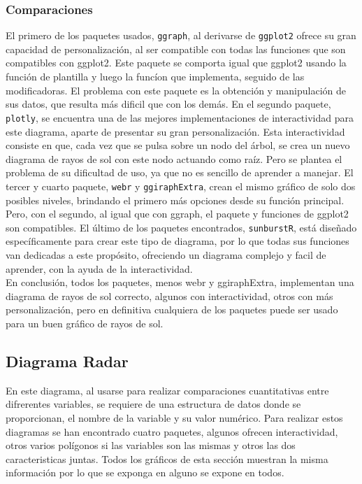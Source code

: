 \documentclass{article}\usepackage[]{graphicx}\usepackage[]{color}
\begin{document}
\subsubsection{Comparaciones}
El primero de los paquetes usados, \texttt{ggraph}, al derivarse de \texttt{ggplot2} ofrece su gran capacidad de personalizaci\'on, al ser compatible con todas las funciones que son compatibles con ggplot2. Este paquete se comporta igual que ggplot2 usando la funci\'on de plantilla y luego la func\'ion que implementa, seguido de las modificadoras. El problema con este paquete es la obtenci\'on y manipulaci\'on de sus datos, que resulta m\'as dificil que con los dem\'as.
En el segundo paquete, \texttt{plotly}, se encuentra una de las mejores implementaciones de interactividad para este diagrama, aparte de presentar su gran personalizaci\'on. Esta interactividad consiste en que, cada vez que se pulsa sobre un nodo del \'arbol, se crea un nuevo diagrama de rayos de sol con este nodo actuando como ra\'iz. Pero se plantea el problema de su dificultad de uso, ya que no es sencillo de aprender a manejar.
El tercer y cuarto paquete, \texttt{webr} y \texttt{ggiraphExtra}, crean el mismo gr\'afico de solo dos posibles niveles, brindando el primero m\'as opciones desde su funci\'on principal. Pero, con el segundo, al igual que con ggraph, el paquete y funciones de ggplot2 son compatibles.
El \'ultimo de los paquetes encontrados, \texttt{sunburstR}, est\'a dise\~nado espec\'ificamente para crear este tipo de diagrama, por lo que todas sus funciones van dedicadas a este prop\'osito, ofreciendo un diagrama complejo y facil de aprender, con la ayuda de la interactividad.~\\
En conclusi\'on, todos los paquetes, menos webr y ggiraphExtra, implementan una diagrama de rayos de sol correcto, algunos con interactividad, otros con m\'as personalizaci\'on, pero en definitiva cualquiera de los paquetes puede ser usado para un buen gr\'afico de rayos de sol.
\clearpage
\subsection{Diagrama Radar}\label{ssec:radar}
En este diagrama, al usarse para realizar comparaciones cuantitativas entre difrerentes variables, se requiere de una estructura de datos donde se proporcionan, el nombre de la variable y su valor num\'erico. 
Para realizar estos diagramas se han encontrado cuatro paquetes, algunos ofrecen interactividad, otros varios pol\'igonos si las variables son las mismas y otros las dos caracteristicas juntas. Todos los gr\'aficos de esta secci\'on muestran la misma informaci\'on por lo que se exponga en alguno se expone en todos.
\end{document}
